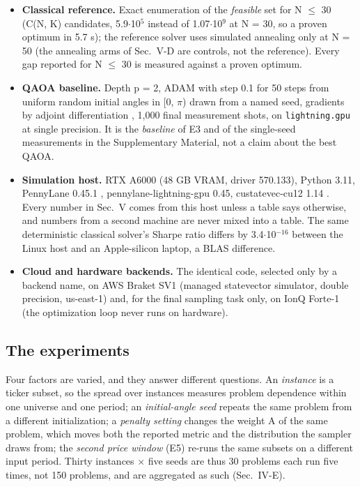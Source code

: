 \documentclass[journal]{IEEEtran}
\begin{document}
\begin{itemize}
\item \textbf{Classical reference.} Exact enumeration of the \textit{feasible} set for N $\leq$ 30 (C(N, K) candidates, 5.9$\cdot$10$^{5}$ instead of 1.07$\cdot$10$^{9}$ at N = 30, so a proven optimum in 5.7 s); the reference solver uses simulated annealing \cite{ref44} only at N = 50 (the annealing arms of Sec.~V-D are controls, not the reference). Every gap reported for N $\leq$ 30 is measured against a proven optimum.
\item \textbf{QAOA baseline.} Depth p = 2, ADAM \cite{ref45} with step 0.1 for 50 steps from uniform random initial angles in [0, $\pi$) drawn from a named seed, gradients by adjoint differentiation \cite{ref40}, 1,000 final measurement shots, on \texttt{lightning.gpu} at single precision. It is the \textit{baseline} of E3 and of the single-seed measurements in the Supplementary Material, not a claim about the best QAOA.
\item \textbf{Simulation host.} RTX A6000 (48 GB VRAM, driver 570.133), Python 3.11, PennyLane 0.45.1 \cite{ref38}, pennylane-lightning-gpu 0.45, custatevec-cu12 1.14 \cite{ref39}. Every number in Sec.~V comes from this host unless a table says otherwise, and numbers from a second machine are never mixed into a table. The same deterministic classical solver's Sharpe ratio differs by 3.4$\cdot$10$^{-16}$ between the Linux host and an Apple-silicon laptop, a BLAS difference.
\item \textbf{Cloud and hardware backends.} The identical code, selected only by a backend name, on AWS Braket SV1 (managed statevector simulator, double precision, us-east-1) and, for the final sampling task only, on IonQ Forte-1 (the optimization loop never runs on hardware).
\end{itemize}


\subsection{The experiments}


Four factors are varied, and they answer different questions. An \textit{instance} is a ticker subset, so the spread over instances measures problem dependence within one universe and one period; an \textit{initial-angle seed} repeats the same problem from a different initialization; a \textit{penalty setting} changes the weight A of the same problem, which moves both the reported metric and the distribution the sampler draws from; the \textit{second price window} (E5) re-runs the same subsets on a different input period. Thirty instances $\times$ five seeds are thus 30 problems each run five times, not 150 problems, and are aggregated as such (Sec.~IV-E).
\end{document}
